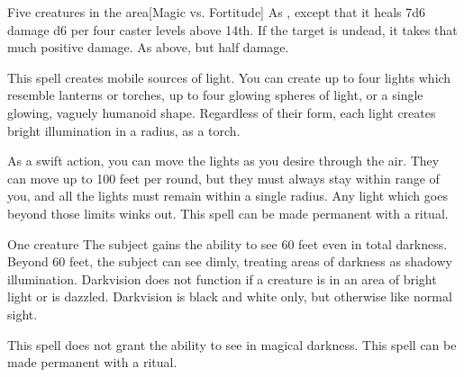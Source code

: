 \begin{spelltargets}{Five creatures in the area}[Magic vs. Fortitude]
    \spelleffect As , except that it heals 7d6 damage \add d6 per four caster levels above 14th.
    \spellsuccess If the target is undead, it takes that much positive damage.
    \spellfailure As above, but half damage.
\end{spelltargets}

\begin{comment}
\subsubsection{D}
\end{comment}

\spelldur{\durshort \dismissable}
\spellline
\spelleffect This spell creates mobile sources of light. You can create up to four lights which resemble lanterns or torches, up to four glowing spheres of light, or a single glowing, vaguely humanoid shape. Regardless of their form, each light creates bright illumination in a \areamed radius, as a torch.

As a swift action, you can move the lights as you desire through the air. They can move up to 100 feet per round, but they must always stay within range of you, and all the lights must remain within a single \areamed radius. Any light which goes beyond those limits winks out.
\spellnotes This spell can be made permanent with a  ritual.

\spellrng{\rngtouch}
\spelldur{\durlong}
\begin{spelltarget}{One creature}
    \spelleffect The subject gains the ability to see 60 feet even in total darkness. Beyond 60 feet, the subject can see dimly, treating areas of darkness as shadowy illumination. Darkvision does not function if a creature is in an area of bright light or is dazzled. Darkvision is black and white only, but otherwise like normal sight.
\end{spelltarget}
\spellnotes This spell does not grant the ability to see in magical darkness. This spell can be made permanent with a  ritual.

